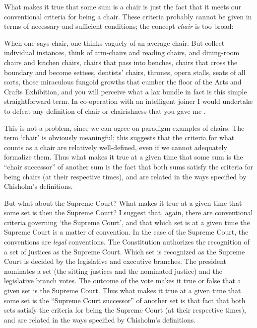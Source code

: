 \documentclass[12pt,twoside]{reedfancy}
\newenvironment{squote}{%
	\begin{spacing}{1}
	\begin{list}{}{%
	\setlength{\labelwidth}{0pt}%
	\rightmargin\leftmargin%
	}
	\item\relax
	}{%
	\end{list}%
	\end{spacing}
	}
\begin{document}
\begin{spacing}{1.25}
What makes it true that some sum is a chair is just the fact that it
meets our conventional criteria for being a chair.  These criteria
probably cannot be given in terms of necessary and sufficient
conditions; the concept {\em chair} is too broad:

\begin{squote}
When one says chair, one thinks vaguely of an average chair.  But
collect individual instances, think of arm-chairs and reading chairs,
and dining-room chairs and kitchen chairs, chairs that pass into
benches, chairs that cross the boundary and become settees, dentists'
chairs, thrones, opera stalls, seats of all sorts, those miraculous
fungoid growths that cumber the floor of the Arts and Crafts
Exhibition, and you will perceive what a lax bundle in fact is this
simple straightforward term.  In co-operation with an intelligent
joiner I would undertake to defeat any definition of chair or
chairishness that you gave me \citep[384--385]{wells1904}.
\end{squote}
This is not a problem, since we can agree on paradigm examples of
chairs.  The term `chair' is obviously meaningful; this suggests that
the criteria for what counts as a chair are relatively well-defined,
even if we cannot adequately formalize them.  Thus what makes it true
at a given time that some sum is the ``chair successor'' of another
sum is the fact that both sums satisfy the criteria for being chairs
(at their respective times), and are related in the ways specified by
Chisholm's definitions.

But what about the Supreme Court?  What makes it true at a given time
that some set is then the Supreme Court?  I suggest that, again, there
are conventional criteria governing `the Supreme Court', and that
which set is at a given time the Supreme Court is a matter of
convention.  In the case of the Supreme Court, the conventions are
{\em legal} conventions.  The Constitution authorizes the recognition
of a set of justices as the Supreme Court.  Which set is recognized as
the Supreme Court is decided by the legislative and executive
branches.  The president nominates a set (the sitting justices and the
nominated justice) and the legislative branch votes.  The outcome of
the vote makes it true or false that a given set is the Supreme Court.
Thus what makes it true at a given time that some set is the ``Supreme
Court successor'' of another set is that fact that both sets satisfy
the criteria for being the Supreme Court (at their respective times),
and are related in the ways specified by Chisholm's definitions.


\end{spacing}
\end{document}
